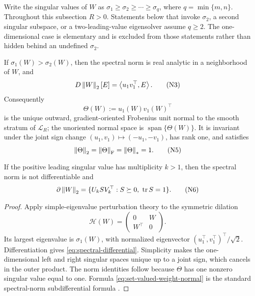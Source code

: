 Write the singular values of \(W\) as
\(\sigma_1\ge\sigma_2\ge\cdots\ge\sigma_q\), where
\(q=\min\{m,n\}\).  Throughout this subsection \(R>0\).
Statements below that invoke \(\sigma_2\), a second singular subspace, or a
two-leading-value eigensolver assume \(q\ge2\).  The one-dimensional case is
elementary and is excluded from those statements rather than hidden behind an
undefined \(\sigma_2\).

\begin{lemma}
\label{lem:spectral-normal}
If \(\sigma_1(W)>\sigma_2(W)\), then the spectral norm is real analytic in a
neighborhood of \(W\), and
\begin{equation}
 D\left\lVert W\right\rVert_{2}[E]
 =
 \left\langle u_1v_1^\top,E\right\rangle.
\tag{N3}
\label{eq:spectral-differential}
\end{equation}
Consequently
\begin{equation}
 \Theta(W):=u_1(W)v_1(W)^\top
\tag{N4}
\label{eq:true-normal}
\end{equation}
is the unique outward, gradient-oriented Frobenius unit normal to the smooth
stratum of \(\mathcal L_R\); the unoriented normal space is
\(\operatorname{span}\{\Theta(W)\}\).  It is invariant under the joint sign change
\((u_1,v_1)\mapsto(-u_1,-v_1)\), has rank one, and satisfies
\begin{equation}
 \left\lVert \Theta\right\rVert_{2}=\left\lVert \Theta\right\rVert_{\mathrm F}=\left\lVert \Theta\right\rVert_{*}=1.
\tag{N5}
\end{equation}

If the positive leading singular value has multiplicity \(k>1\), then the
spectral norm is not differentiable and
\begin{equation}
 \partial\left\lVert W\right\rVert_{2}
 =
 \{U_kSV_k^\top:S\succeq0,\ \operatorname{tr} S=1\}.
\tag{N6}
\label{eq:set-valued-weight-normal}
\end{equation}
\end{lemma}

\begin{proof}
Apply simple-eigenvalue perturbation theory to the symmetric dilation
\[
 \mathcal H(W)
 =
 \begin{pmatrix}0&W\\W^\top&0\end{pmatrix}.
\]
Its largest eigenvalue is \(\sigma_1(W)\), with normalized eigenvector
\((u_1^\top,v_1^\top)^\top/\sqrt2\).  Differentiation gives
\eqref{eq:spectral-differential}.  Simplicity makes the one-dimensional left
and right singular spaces unique up to a joint sign, which cancels in the
outer product.  The norm identities follow because \(\Theta\) has one
nonzero singular value equal to one.  Formula
\eqref{eq:set-valued-weight-normal} is the standard spectral-norm
subdifferential formula \citep{watson1992subdifferential}.
\end{proof}

